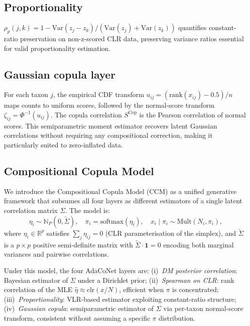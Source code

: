 \documentclass[unnumsec,webpdf,contemporary,large,numbered]{oup-authoring-template}
\theoremstyle{plain}
\theoremstyle{definition}
\newcommand{\N}{\mathbb{N}}
\newcommand{\Var}{\mathrm{Var}}
\begin{document}
\subsection{Proportionality}\label{ssec:prop}

$\rho_p(j,k) = 1 - \Var(z_j - z_k)/(\Var(z_j) + \Var(z_k))$ quantifies constant-ratio preservation on non-z-scored CLR data, preserving variance ratios essential for valid proportionality estimation.

\subsection{Gaussian copula layer}\label{ssec:copula}

For each taxon $j$, the empirical CDF transform $u_{ij} = (\text{rank}(x_{ij}) - 0.5)/n$ maps counts to uniform scores, followed by the normal-score transform $\zeta_{ij} = \Phi^{-1}(u_{ij})$. The copula correlation $S^{\text{Cop}}$ is the Pearson correlation of normal scores. This semiparametric moment estimator \cite{quinn2019} recovers latent Gaussian correlations without requiring any compositional correction, making it particularly suited to zero-inflated data.

\subsection{Compositional Copula Model}\label{ssec:ccm}

We introduce the Compositional Copula Model (CCM) as a unified generative framework that subsumes all four layers as different estimators of a single latent correlation matrix $\Sigma$. The model is:
\begin{equation}
\eta_i \sim \N_P(0, \widetilde{\Sigma}), \quad
\pi_i = \text{softmax}(\eta_i), \quad
x_i \mid \pi_i \sim \text{Mult}(N_i, \pi_i),
\end{equation}
where $\eta_i \in \mathbb{R}^p$ satisfies $\sum_j \eta_{ij} = 0$ (CLR parameterisation of the simplex), and $\widetilde{\Sigma}$ is a $p \times p$ positive semi-definite matrix with $\widetilde{\Sigma} \cdot \mathbf{1} = 0$ encoding both marginal variances and pairwise correlations.

Under this model, the four AdaCoNet layers are:
(i)~\textit{DM posterior correlation}: Bayesian estimator of $\Sigma$ under a Dirichlet prior;
(ii)~\textit{Spearman on CLR}: rank correlation of the MLE $\hat{\eta} \approx \text{clr}(x/N)$, efficient when $\pi$ is concentrated;
(iii)~\textit{Proportionality}: VLR-based estimator exploiting constant-ratio structure;
(iv)~\textit{Gaussian copula}: semiparametric estimator of $\Sigma$ via per-taxon normal-score transform, consistent without assuming a specific $\pi$ distribution.
\end{document}
